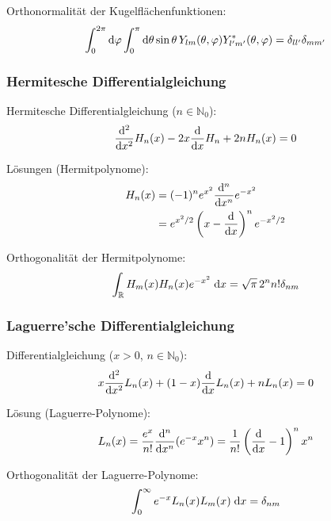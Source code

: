 \documentclass[11pt]{article}
\numberwithin{equation}{section}
\begin{document}
				\noindent
				Orthonormalität der Kugelflächenfunktionen:
				\begin{equation}
					\int_0^{2\pi}\mathrm{d}\varphi \int_0^{\pi}\mathrm{d}\theta \sin\theta\, Y_{lm}(\theta,\varphi) Y^{*}_{l'm'}(\theta,\varphi) = 	\delta_{ll'}\delta_{mm'}
				\end{equation}

			\subsubsection{Hermitesche Differentialgleichung}
				\noindent
				Hermitesche Differentialgleichung ($n\in\mathbb{N}_0$):
				\begin{equation}
					\frac{\mathrm{d}^2}{\mathrm{d} x^2} H_n(x) -2x\frac{\mathrm{d} }{\mathrm{d} x} H_n+2 n H_n(x)=0
				\end{equation}

				\noindent
				Lösungen (Hermitpolynome):
				\begin{equation} \label{eq:Hermitpolynome}
					\begin{aligned}
						H_n(x) &= (-1)^n e^{x^2} \frac{\mathrm{d}^n}{\mathrm{d} x^n}e^{-x^2} \\
						&= e^{x^2/2}\left(x-\frac{\mathrm{d} }{\mathrm{d} x}\right)^n e^{-x^2/2} \\
					\end{aligned}
				\end{equation}

				\noindent
				Orthogonalität der Hermitpolynome:
				\begin{equation}
					\int_{\mathbb{R}} H_m(x) H_n(x) e^{-x^2}\;\mathrm{d} x = \sqrt{\pi}\,2^n n!\delta_{nm}
				\end{equation}

			\subsubsection{Laguerre'sche Differentialgleichung}
				\noindent
				Differentialgleichung ($x>0$, $n\in\mathbb{N}_0$):
				\begin{equation}
					x\frac{\mathrm{d}^2}{\mathrm{d} x^2}L_n(x) +(1-x)\frac{\mathrm{d} }{\mathrm{d} x}L_n(x) + nL_n(x) = 0
				\end{equation}

				\noindent
				Lösung (Laguerre-Polynome):
				\begin{equation}
					L_n(x) = \frac{e^x}{n!}\frac{\mathrm{d}^n}{\mathrm{d} x^n}(e^{-x} x^n) = \frac{1}{n!} \left(\frac{\mathrm{d} }{\mathrm{d} x}-1\right)^n x^n
				\end{equation}

				\noindent
				Orthogonalität der Laguerre-Polynome:
				\begin{equation}
					\int_0^\infty e^{-x} L_n(x) L_m(x)\;\mathrm{d} x = \delta_{nm}
				\end{equation}
\end{document}
